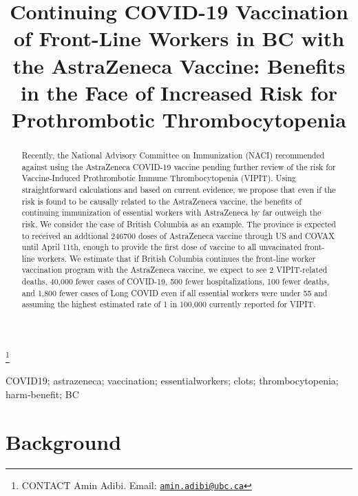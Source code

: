 \documentclass[]{interact}
\theoremstyle{plain}%
\theoremstyle{definition}
\theoremstyle{remark}
\begin{document}

\title{Continuing COVID-19 Vaccination of Front-Line Workers in BC with
the AstraZeneca Vaccine: Benefits in the Face of Increased Risk for
Prothrombotic Thrombocytopenia}


\author{
}

\thanks{CONTACT Amin
Adibi. Email: \href{mailto:amin.adibi@ubc.ca}{\nolinkurl{amin.adibi@ubc.ca}}}

\maketitle

\begin{abstract}
Recently, the National Advisory Committee on Immunization (NACI)
recommended against using the AstraZeneca COVID-19 vaccine pending
further review of the risk for Vaccine-Induced Prothrombotic Immune
Thrombocytopenia (VIPIT). Using straightforward calculations and based
on current evidence, we propose that even if the risk is found to be
causally related to the AstraZeneca vaccine, the benefits of continuing
immunization of essential workers with AstraZeneca by far outweigh the
risk. We consider the case of British Columbia as an example. The
province is expected to received an addtional 246700 doses of
AstraZeneca vaccine through US and COVAX until April 11th, enough to
provide the first dose of vaccine to all unvacinated front-line workers.
We estimate that if British Columbia continues the front-line worker
vaccination program with the AstraZeneca vaccine, we expect to see 2
VIPIT-related deaths, 40,000 fewer cases of COVID-19, 500 fewer
hospitalizations, 100 fewer deaths, and 1,800 fewer cases of Long COVID
even if all essential workers were under 55 and assuming the highest
estimated rate of 1 in 100,000 currently reported for VIPIT.
\end{abstract}

\begin{keywords}
COVID19; astrazeneca; vaccination; essentialworkers; clots;
thrombocytopenia; harm-benefit; BC
\end{keywords}

\hypertarget{background}{%
\section{Background}\label{background}}
\end{document}
